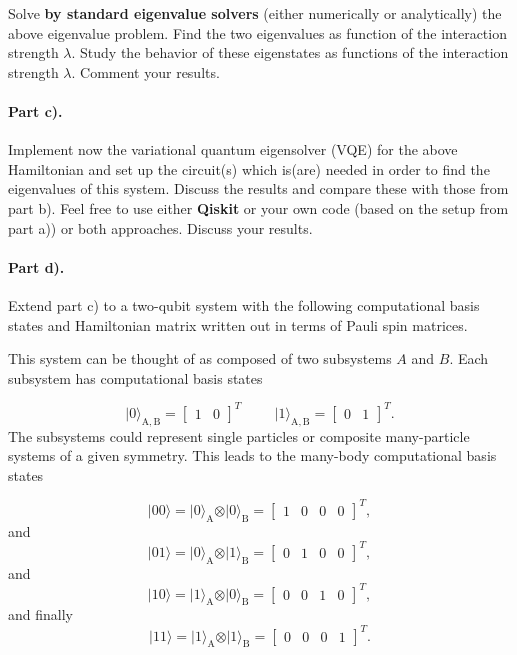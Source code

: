 \documentclass[%
oneside,                 %
final,                   %
10pt]{article}
\begin{document}
Solve \textbf{by standard eigenvalue solvers} (either numerically or analytically) the above eigenvalue problem.
Find the two eigenvalues as function of the interaction strength $\lambda$.
Study the behavior of these eigenstates as functions of the interaction strength $\lambda$.
Comment your results.

\paragraph{Part c).}
Implement now the variational quantum eigensolver (VQE) for the above
Hamiltonian and set up the circuit(s) which is(are) needed in order to find
the eigenvalues of this system. Discuss the results and compare these
with those from part b). Feel free to use either \textbf{Qiskit} or your own
code (based on the setup from part a)) or both approaches. Discuss
your results.

\paragraph{Part d).}
Extend part c) to a two-qubit system with the following computational
basis states and Hamiltonian matrix written out in terms of Pauli spin
matrices.

This system can be thought of as composed of two subsystems
$A$ and $B$. Each subsystem has computational basis states

\[
\vert 0\rangle_{\mathrm{A,B}}=\begin{bmatrix} 1 & 0\end{bmatrix}^T \hspace{1cm} \vert 1\rangle_{\mathrm{A,B}}=\begin{bmatrix} 0 & 1\end{bmatrix}^T.
\]
The subsystems could represent single particles or composite many-particle systems of a given symmetry.
This leads to the many-body computational basis states

\[
\vert 00\rangle = \vert 0\rangle_{\mathrm{A}}\otimes \vert 0\rangle_{\mathrm{B}}=\begin{bmatrix} 1 & 0 & 0 &0\end{bmatrix}^T,
\]
and
\[
\vert 01\rangle = \vert 0\rangle_{\mathrm{A}}\otimes \vert 1\rangle_{\mathrm{B}}=\begin{bmatrix} 0 & 1 & 0 &0\end{bmatrix}^T,
\]
and
\[
\vert 10\rangle = \vert 1\rangle_{\mathrm{A}}\otimes \vert 0\rangle_{\mathrm{B}}=\begin{bmatrix} 0 & 0 & 1 &0\end{bmatrix}^T,
\]
and finally
\[
\vert 11\rangle = \vert 1\rangle_{\mathrm{A}}\otimes \vert 1\rangle_{\mathrm{B}}=\begin{bmatrix} 0 & 0 & 0 &1\end{bmatrix}^T.
\]
\end{document}
